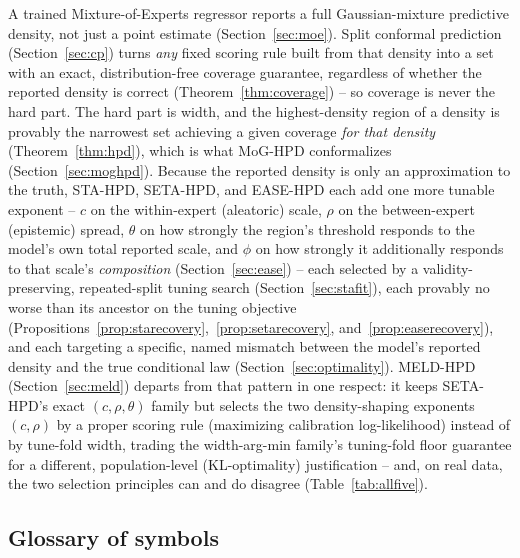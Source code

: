 \documentclass[11pt]{article}
\begin{document}
A trained Mixture-of-Experts regressor reports a full Gaussian-mixture predictive density, not
just a point estimate (Section~\ref{sec:moe}). Split conformal prediction (Section~\ref{sec:cp})
turns \emph{any} fixed scoring rule built from that density into a set with an exact,
distribution-free coverage guarantee, regardless of whether the reported density is correct
(Theorem~\ref{thm:coverage}) -- so coverage is never the hard part. The hard part is width, and
the highest-density region of a density is provably the narrowest set achieving a given coverage
\emph{for that density} (Theorem~\ref{thm:hpd}), which is what MoG-HPD conformalizes
(Section~\ref{sec:moghpd}). Because the reported density is only an approximation to the truth,
STA-HPD, SETA-HPD, and EASE-HPD each add one more tunable exponent -- $c$ on the within-expert
(aleatoric) scale, $\rho$ on the between-expert (epistemic) spread, $\theta$ on how strongly the
region's threshold responds to the model's own total reported scale, and $\phi$ on how strongly it
additionally responds to that scale's \emph{composition} (Section~\ref{sec:ease}) -- each selected
by a validity-preserving, repeated-split tuning search (Section~\ref{sec:stafit}), each provably no
worse than its ancestor on the tuning objective
(Propositions~\ref{prop:starecovery},~\ref{prop:setarecovery}, and~\ref{prop:easerecovery}), and
each targeting a specific, named mismatch between the model's reported density and the true
conditional law (Section~\ref{sec:optimality}). MELD-HPD (Section~\ref{sec:meld}) departs from that
pattern in one respect: it keeps SETA-HPD's exact $(c,\rho,\theta)$ family but selects the two
density-shaping exponents $(c,\rho)$ by a proper scoring rule (maximizing calibration
log-likelihood) instead of by tune-fold width, trading the width-arg-min family's tuning-fold floor
guarantee for a different, population-level (KL-optimality) justification -- and, on real data, the
two selection principles can and do disagree (Table~\ref{tab:allfive}).

\subsection{Glossary of symbols}
\end{document}
